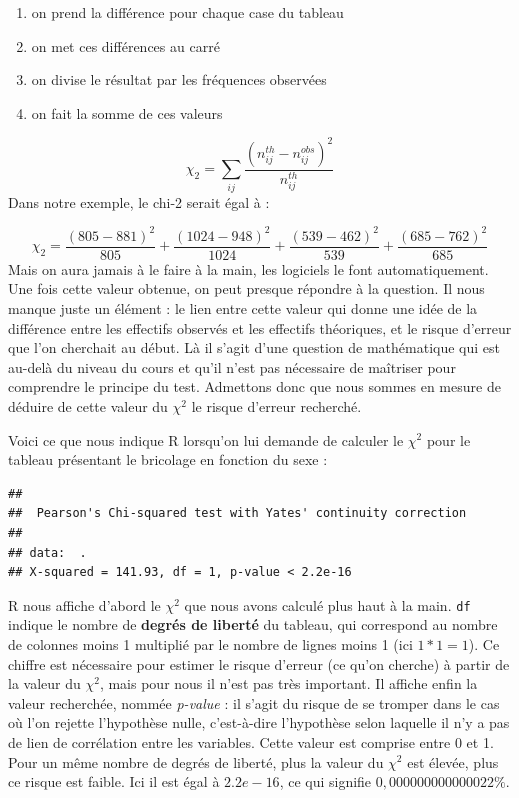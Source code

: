 \documentclass[
]{book}
\newenvironment{Shaded}{\begin{snugshade}}{\end{snugshade}}
\newcommand{\FunctionTok}[1]{\textcolor[rgb]{0.00,0.00,0.00}{#1}}
\newcommand{\NormalTok}[1]{#1}
\newcommand{\SpecialCharTok}[1]{\textcolor[rgb]{0.00,0.00,0.00}{#1}}
\providecommand{\tightlist}{%
  \setlength{\itemsep}{0pt}\setlength{\parskip}{0pt}}
\begin{document}
\begin{enumerate}
\def\labelenumi{\arabic{enumi}.}
\tightlist
\item
  on prend la différence pour chaque case du tableau
\item
  on met ces différences au carré
\item
  on divise le résultat par les fréquences observées
\item
  on fait la somme de ces valeurs
\end{enumerate}

\[\chi_2 = \sum_{ij} \frac{(n^{th}_{ij} - n^{obs}_{ij})^2}{n^{th}_{ij}}\]
Dans notre exemple, le chi-2 serait égal à :

\[ \chi_2 = \frac{(805-881)^2}{805} + \frac{(1024-948)^2}{1024}+\frac{(539-462)^2}{539} + \frac{(685-762)^2}{685} \]
Mais on aura jamais à le faire à la main, les logiciels le font automatiquement. Une fois cette valeur obtenue, on peut presque répondre à la question. Il nous manque juste un élément : le lien entre cette valeur qui donne une idée de la différence entre les effectifs observés et les effectifs théoriques, et le risque d'erreur que l'on cherchait au début. Là il s'agit d'une question de mathématique qui est au-delà du niveau du cours et qu'il n'est pas nécessaire de maîtriser pour comprendre le principe du test. Admettons donc que nous sommes en mesure de déduire de cette valeur du \(\chi^2\) le risque d'erreur recherché.

Voici ce que nous indique R lorsqu'on lui demande de calculer le \(\chi^2\) pour le tableau présentant le bricolage en fonction du sexe :

\begin{Shaded}
\end{Shaded}

\begin{verbatim}
## 
##  Pearson's Chi-squared test with Yates' continuity correction
## 
## data:  .
## X-squared = 141.93, df = 1, p-value < 2.2e-16
\end{verbatim}

R nous affiche d'abord le \(\chi^2\) que nous avons calculé plus haut à la main. \texttt{df} indique le nombre de \textbf{degrés de liberté} du tableau, qui correspond au nombre de colonnes moins 1 multiplié par le nombre de lignes moins 1 (ici \(1*1=1\)). Ce chiffre est nécessaire pour estimer le risque d'erreur (ce qu'on cherche) à partir de la valeur du \(\chi^2\), mais pour nous il n'est pas très important. Il affiche enfin la valeur recherchée, nommée \emph{p-value} : il s'agit du risque de se tromper dans le cas où l'on rejette l'hypothèse nulle, c'est-à-dire l'hypothèse selon laquelle il n'y a pas de lien de corrélation entre les variables. Cette valeur est comprise entre 0 et 1. Pour un même nombre de degrés de liberté, plus la valeur du \(\chi^2\) est élevée, plus ce risque est faible. Ici il est égal à \(2.2e-16\), ce qui signifie \(0,000000000000022 \%\).
\end{document}
